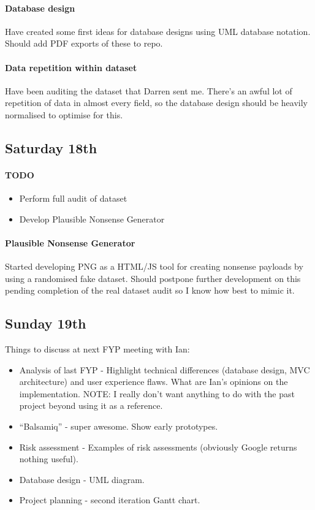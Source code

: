\paragraph{Database design} Have created some first ideas for database designs
using UML database notation. Should add PDF exports of these to repo.

\paragraph{Data repetition within dataset} Have been auditing the dataset that
Darren sent me. There's an awful lot of repetition of data in almost every
field, so the database design should be heavily normalised to optimise for this.

\subsection{Saturday 18th}

\paragraph{TODO}
\begin{itemize}
\item Perform full audit of dataset
\item Develop Plausible Nonsense Generator
\end{itemize}

\paragraph{Plausible Nonsense Generator} Started developing PNG as a HTML/JS
tool for creating nonsense payloads by using a randomised fake dataset. Should
postpone further development on this pending completion of the real dataset
audit so I know how best to mimic it.

\subsection{Sunday 19th}

\noindent
Things to discuss at next FYP meeting with Ian:
\begin{itemize}
\item Analysis of last FYP - Highlight technical differences (database design,
  MVC architecture) and user experience flaws. What are Ian's opinions on the
  implementation. NOTE: I really don't want anything to do with the past
  project beyond using it as a reference.
\item ``Balsamiq'' - super awesome. Show early prototypes.
\item Risk assessment - Examples of risk assessments (obviously Google returns
  nothing useful).
\item Database design - UML diagram.
\item Project planning - second iteration Gantt chart.
\end{itemize}

